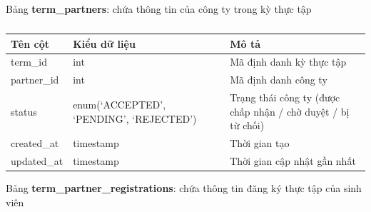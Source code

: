 \documentclass[./../main.tex]{subfiles}
\begin{document}
Bảng \textbf{term\_partners}: chứa thông tin của công ty trong kỳ thực tập

\begin{table}[H]
	\caption{}
	\label{tab:db_term_partners}
	\begin{tabularx}{\textwidth}{|l|X|X|}
	\hline
	\textbf{Tên cột} & \textbf{Kiểu dữ liệu}                   & \textbf{Mô tả}                                               \\ \hline
	term\_id         & int                                     & Mã định danh kỳ thực tập                                     \\ \hline
	partner\_id      & int                                     & Mã định danh công ty                                         \\ \hline
	status           & enum(‘ACCEPTED', ‘PENDING', ‘REJECTED’) & Trạng thái công ty (được chấp nhận / chờ duyệt / bị từ chối) \\ \hline
	created\_at      & timestamp                               & Thời gian tạo                                                \\ \hline
	updated\_at      & timestamp                               & Thời gian cập nhật gần nhất                                  \\ \hline
	\end{tabularx}
\end{table}

Bảng \textbf{term\_partner\_registrations}: chứa thông tin đăng ký thực tập của sinh viên
\end{document}
